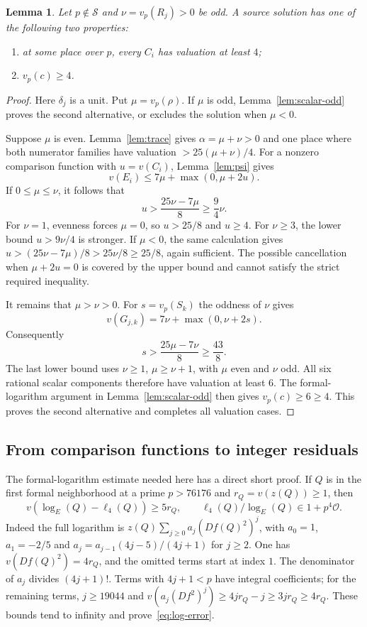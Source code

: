 \documentclass[11pt,a4paper]{article}
\newtheorem{lemma}[theorem]{Lemma}
\begin{document}
\begin{lemma}\label{lem:mixed}
Let $p\notin\mathcal S$ and $\nu=v_p(R_j)>0$ be odd. A source
solution has one of the following two properties:
\begin{enumerate}
\item at some place over $p$, every $C_i$ has valuation at least $4$;
\item $v_p(c)\ge4$.
\end{enumerate}
\end{lemma}
\begin{proof}
Here $\delta_j$ is a unit. Put $\mu=v_p(\rho)$. If $\mu$ is
odd, Lemma~\ref{lem:scalar-odd} proves the second alternative,
or excludes the solution when $\mu<0$.

Suppose $\mu$ is even. Lemma~\ref{lem:trace} gives
$\alpha=\mu+\nu>0$ and one place where both numerator families
have valuation $>25(\mu+\nu)/4$. For a nonzero comparison
function with $u=v(C_i)$, Lemma~\ref{lem:psi} gives
\[
 v(E_i)\le7\mu+\max(0,\mu+2u).
\]
If $0\le\mu\le\nu$, it follows that
\[
 u>\frac{25\nu-7\mu}{8}\ge\frac94\nu.
\]
For $\nu=1$, evenness forces $\mu=0$, so $u>25/8$ and
$u\ge4$. For $\nu\ge3$, the lower bound $u>9\nu/4$ is
stronger. If $\mu<0$, the same calculation gives
$u>(25\nu-7\mu)/8>25\nu/8\ge25/8$, again sufficient.
The possible cancellation when $\mu+2u=0$ is covered by the
upper bound and cannot satisfy the strict required inequality.

It remains that $\mu>\nu>0$. For $s=v_p(S_k)$ the oddness of
$\nu$ gives
\[
 v(G_{j,k})=7\nu+\max(0,\nu+2s).
\]
Consequently
\[
 s>\frac{25\mu-7\nu}{8}\ge\frac{43}{8}.
\]
The last lower bound uses $\nu\ge1$, $\mu\ge\nu+1$, with
$\mu$ even and $\nu$ odd. All six rational scalar components
therefore have valuation at least $6$.
The formal-logarithm argument in Lemma~\ref{lem:scalar-odd}
then gives $v_p(c)\ge6\ge4$. This proves the second
alternative and completes all valuation cases.
\end{proof}

\subsection{From comparison functions to integer residuals}

The formal-logarithm estimate needed here has a direct short proof.
If $Q$ is in the first formal neighborhood at a prime
$p>76176$ and $r_Q=v(z(Q))\ge1$, then
\begin{equation}\label{eq:log-error}
 v(\log_E(Q)-\ell_4(Q))\ge5r_Q,
 \qquad \ell_4(Q)/\log_E(Q)\in1+p^{4}\mathcal O.
\end{equation}
Indeed the full logarithm is
$z(Q)\sum_{j\ge0}a_j(Df(Q)^2)^j$, with
$a_0=1$, $a_1=-2/5$ and
$a_j=a_{j-1}(4j-5)/(4j+1)$ for $j\ge2$.
One has $v(Df(Q)^2)=4r_Q$, and the omitted terms start at index
$1$. The denominator of $a_j$ divides $(4j+1)!$. Terms with
$4j+1<p$ have integral coefficients; for the remaining terms,
$j\ge19044$ and
$v(a_j(Df^2)^j)\ge4jr_Q-j\ge3jr_Q\ge4r_Q$.
These bounds tend to infinity and prove~\eqref{eq:log-error}.
\end{document}
